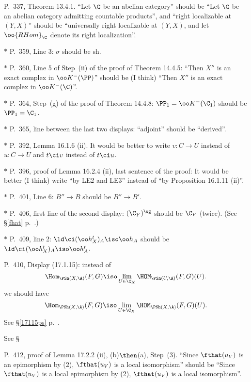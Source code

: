 \documentclass[12pt]{article}
\theoremstyle{remark}
\theoremstyle{definition}
\begin{document}
\begin{s}
P.~337, Theorem 13.4.1. ``Let $\C$ be an abelian category'' should be ``Let $\C$ be an abelian category admitting countable products'', and ``right localizable at $(Y,X)$'' should be ``universally right localizable at $(Y,X)$, and let $\oo{RHom}_\C$ denote its right localization''.
\end{s}

\nn$*$ P.~359, Line 3: $\sigma$ should be sh.

\nn$*$ P.~360, Line 5 of Step~(ii) of the proof of Theorem 14.4.5: ``Then $X''$ is an exact complex in $\oo K^-(\PP)$'' should be (I think) ``Then $X''$ is an exact complex in $\oo K^-(\C)$''.

\nn$*$ P.~364, Step~(g) of the proof of Theorem 14.4.8: $\PP_1=\oo K^-(\C_1)$ should be $\PP_1=\C_1$.

\nn$*$ P.~365, line between the last two displays: ``adjoint'' should be ``derived''.

\nn$*$ P.~392, Lemma 16.1.6 (ii). It would be better to write $v:C\to U$ instead of $u:C\to U$ and $t\ci v$ instead of $t\ci u$.

\nn$*$ P.~396, proof of Lemma 16.2.4 (ii), last sentence of the proof: It would be better (I think) write ``by LE2 and LE3'' instead of ``by Proposition 16.1.11 (ii)''.

\nn$*$ P.~401, Line 6: $B''\to B$ should be $B''\to B'$.

\nn$*$ P.~406, first line of the second display: $(\C_Y)^\wg$ should be $\C_Y$ (twice). (See \S\ref{fhat} p.~.)

\nn$*$ P.~409, line 2: $\ld\ci(\oo h_X^t)_A\iso\oo h_A$ should be $\ld\ci(\oo h_X^t)_A\iso\oo h_A^t$. 

\begin{s}
P.~410, Display (17.1.15): instead of 
$$
\Hom_{\PSh(X,\A)}(F,G)\iso\lim_{U\in\C_X}\HOM_{\PSh(U,\A)}(F,G)(U).
$$
we should have
$$
\Hom_{\PSh(X,\A)}(F,G)\iso\lim_{U\in\C_X}\HOM_{\PSh(X,\A)}(F,G)(U).
$$ 
See \S\ref{17115ps} p.~. 
\end{s}
See \S
%

\begin{s}
P.~412, proof of Lemma 17.2.2 (ii), (b)$\then$(a), Step~(3). ``Since $\fthat(u_V)$ is an epimorphism by (2), $\fthat(u_V)$ is a local isomorphism'' should be ``Since $\fthat(u_V)$ is a local epimorphism by (2), $\fthat(u_V)$ is a local isomorphism''.
\end{s}
\end{document}
